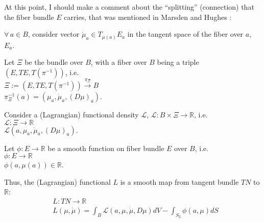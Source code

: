\documentclass[twoside,landscape,10pt]{amsart}
\theoremstyle{plain}
\theoremstyle{definition}
\theoremstyle{remark}
\begin{document}
\begin{multicols*}{2}
At this point, I should make a comment about the ``splitting'' (connection) that the fiber bundle $E$ carries, that was mentioned in Marsden and Hughes \cite{JMarsdenTHughes1994}:


$\forall \, a \in B$, consider vector $\dot{\mu}_a \in T_{\mu(a)}E_a$ in the tangent space of the fiber over $a$, $E_a$.  

Let $\Xi$ be the bundle over $B$, with a fiber over $B$ being a triple $(E,TE,T(\pi^{-1}))$, i.e. \\
$\Xi:= (E,TE, T(\pi^{-1})) \xrightarrow{ \pi_{\Xi}} B$ \\
\phantom{Let} $\pi^{-1}_{\Xi}(a) = (\mu_a, \dot{\mu}_a, (D\mu)_a)$.  

Consider a (Lagrangian) functional density $\mathcal{L}$, $\mathcal{L}:B\times \Xi \to \mathbb{R}$, i.e. \\
$\mathcal{L}: \Xi \to \mathbb{R}$ \\
$\mathcal{L}(a,\mu_a, \dot{\mu}_a, (D\mu)_a)$.  

Let $\phi : E \to \mathbb{R}$ be a smooth function on fiber bundle $E$ over $B$, i.e. \\
$\phi:E \to \mathbb{R}$ \\
$\phi(a,\mu(a)) \in \mathbb{R}$.  

Thus, the (Lagrangian) functional $L$ is a smooth map from tangent bundle $TN$ to $\mathbb{R}$:
\begin{equation}
  \begin{aligned}
    & L: TN \to \mathbb{R} \\
    & L(\mu,\dot{\mu}) = \int_B \mathcal{L}(a, \mu, \dot{\mu},D\mu) dV - \int_{S_2} \phi(a,\mu)dS
\end{aligned}
\end{equation}


\end{multicols*}
\end{document}
